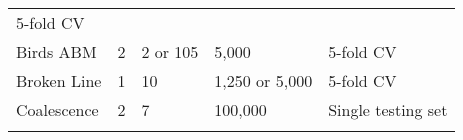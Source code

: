 \documentclass[]{article}
\begin{document}
\begin{longtable}[]{@{}lllll@{}}
\begin{minipage}[t]{0.15\columnwidth}
5-fold CV\strut
\end{minipage}\tabularnewline
\begin{minipage}[t]{0.20\columnwidth}\raggedright
Birds ABM\strut
\end{minipage} & \begin{minipage}[t]{0.15\columnwidth}\raggedright
2\strut
\end{minipage} & \begin{minipage}[t]{0.21\columnwidth}\raggedright
2 or 105\strut
\end{minipage} & \begin{minipage}[t]{0.15\columnwidth}\raggedright
5,000\strut
\end{minipage} & \begin{minipage}[t]{0.15\columnwidth}\raggedright
5-fold CV\strut
\end{minipage}\tabularnewline
\begin{minipage}[t]{0.20\columnwidth}\raggedright
Broken Line\strut
\end{minipage} & \begin{minipage}[t]{0.15\columnwidth}\raggedright
1\strut
\end{minipage} & \begin{minipage}[t]{0.21\columnwidth}\raggedright
10\strut
\end{minipage} & \begin{minipage}[t]{0.15\columnwidth}\raggedright
1,250 or 5,000\strut
\end{minipage} & \begin{minipage}[t]{0.15\columnwidth}\raggedright
5-fold CV\strut
\end{minipage}\tabularnewline
\begin{minipage}[t]{0.20\columnwidth}\raggedright
Coalescence\strut
\end{minipage} & \begin{minipage}[t]{0.15\columnwidth}\raggedright
2\strut
\end{minipage} & \begin{minipage}[t]{0.21\columnwidth}\raggedright
7\strut
\end{minipage} & \begin{minipage}[t]{0.15\columnwidth}\raggedright
100,000\strut
\end{minipage} & \begin{minipage}[t]{0.15\columnwidth}\raggedright
Single testing set\strut
\end{minipage}\tabularnewline
\begin{minipage}[t]{0.20\columnwidth}\raggedright

\end{minipage}
\end{longtable}
\end{document}
